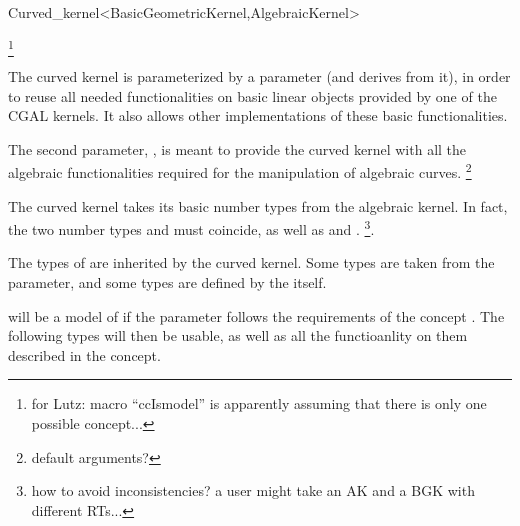 \begin{ccRefClass}{Curved_kernel<BasicGeometricKernel,AlgebraicKernel>}

\ccDefinition


\footnote{for Lutz: macro ``ccIsmodel'' is
apparently assuming that there is only one possible concept...}

\ccParameters

The curved kernel is parameterized by a  parameter
(and derives from it), in order to reuse all needed functionalities on
basic linear objects provided by one of the CGAL kernels. It also
allows other implementations of these basic functionalities.

The second parameter, , is meant to provide the
curved kernel with all the algebraic functionalities required for the
manipulation of algebraic curves. 
\footnote{default arguments?}

\ccInheritsFrom


\ccTypes

\ccThreeToTwo

The curved kernel takes its basic number types from the algebraic kernel. 
In fact, the two number types  and
 must coincide, as well as
 and .
\footnote{how to avoid inconsistencies? a user might take an AK and a
BGK with different RTs...}. 

The types of  are inherited by the curved kernel.
Some types are taken from the  parameter, and
some types are defined by the  itself.

 will be a model of  if the 
 parameter follows the requirements of the 
concept . The following types will then be
usable, as well as all the functioanlity on them described in the
 concept. 

\ccGlue
{} 
\ccGlue
{}
\ccGlue
{}


\end{ccRefClass}
